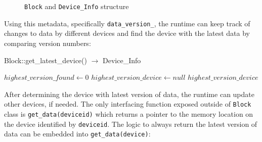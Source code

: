 \begin{figure}[h]
  \caption{\texttt{Block} and \texttt{Device\_Info} structure}\label{fig:Device_Info_Structure}
\end{figure}

Using this metadata, specifically \texttt{data\_version\_}, the runtime can keep
track of changes to data by different devices and find the device with the latest
data by comparing version numbers:

\begin{algorithm} {Block::get\_latest\_device() $\rightarrow$ Device\_Info}
  \singlespacing

  \begin{algorithmic}[1]
    \State $highest\_version\_found \gets 0$
    \State $highest\_version\_device \gets null$
    \EndIf
    \EndFor
    \State \Return $highest\_version\_device$
    \EndFunction
  \end{algorithmic}
\end{algorithm}

After determining the device with latest version of data, the runtime can update
other devices, if needed. The only interfacing function exposed outside of
\texttt{Block} class is \texttt{get\_data(deviceid)} which returns a pointer to the memory
location on the device identified by \texttt{deviceid}. The logic to always return
the latest version of data can be embedded into \texttt{get\_data(device)}:

